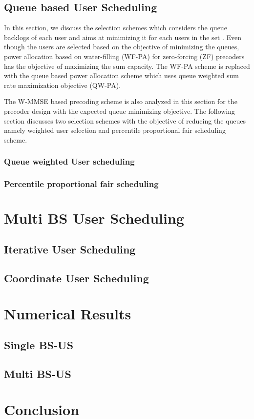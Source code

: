 \documentclass[a4paper,11pt,draft,fleqn,onecolumn,draft]{article}
\begin{document}


\subsection{Queue based User Scheduling} \label{qbus}

In this section, we discuss the selection schemes which considers the queue backlogs of each user and aims at minimizing it for each users in the set . Even though the users are selected based on the objective of minimizing the queues, power allocation based on water-filling (WF-PA) for zero-forcing (ZF) precoders has the objective of maximizing the sum capacity. The WF-PA scheme is replaced with the queue based power allocation scheme which uses queue weighted sum rate maximization objective (QW-PA).

The W-MMSE based precoding scheme is also analyzed in this section for the precoder design with the expected queue minimizing objective. The following section discusses two selection schemes with the objective of reducing the queues namely weighted user selection and percentile proportional fair scheduling scheme.

\subsubsection{Queue weighted User scheduling} \label{weighted-queue-sched}



\subsubsection{Percentile proportional fair scheduling}



\section{Multi BS User Scheduling}

\subsection{Iterative User Scheduling}

\subsection{Coordinate User Scheduling}

\section{Numerical Results}

\subsection{Single BS-US}

\subsection{Multi BS-US}

\section{Conclusion}



\end{document}
